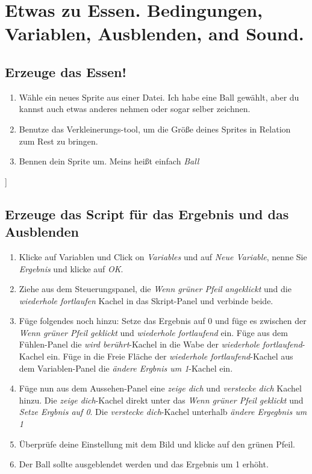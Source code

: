 \section{Etwas zu Essen. Bedingungen, Variablen, Ausblenden, and Sound.}

\subsection{Erzeuge das Essen!}
\begin{enumerate}

\item Wähle ein neues Sprite aus einer Datei. Ich habe eine Ball gewählt, aber du kannst auch etwas anderes nehmen oder sogar selber zeichnen.
\item Benutze das Verkleinerungs-tool, um die Größe deines Sprites in Relation zum Rest zu bringen.
\item Bennen dein Sprite um. Meins heißt einfach \textit{Ball}
\end{enumerate}]

\subsection{Erzeuge das Script für das Ergebnis und das Ausblenden}

\begin{enumerate}
\item Klicke auf Variablen und Click on \textit{Variables} und auf \textit{Neue Variable}, nenne Sie \textit{Ergebnis} und klicke auf \textit{OK}.
\item Ziehe aus dem Steuerungspanel, die \textit{Wenn grüner Pfeil angeklickt} und die \textit{wiederhole fortlaufen} Kachel in das Skript-Panel und verbinde beide.
\item Füge folgendes noch hinzu:
\subitem Setze das Ergebnis auf 0 und füge es zwischen der \textit{Wenn grüner Pfeil geklickt} und \textit{wiederhole fortlaufend} ein.
\subitem Füge aus dem Fühlen-Panel die \textit{wird berührt}-Kachel in die Wabe der \textit{wiederhole fortlaufend}-Kachel ein.
\subitem Füge in die Freie Fläche der \textit{wiederhole fortlaufend}-Kachel aus dem Variablen-Panel die \textit{ändere Ergbnis um 1}-Kachel ein.
\item Füge nun aus dem Aussehen-Panel eine \textit{zeige dich} und \textit{verstecke dich} Kachel hinzu.
\subitem Die \textit{zeige dich}-Kachel direkt unter das \textit{Wenn grüner Pfeil geklickt} und \textit{Setze Ergbnis auf 0}.
\subitem Die \textit{verstecke dich}-Kachel unterhalb \textit{ändere Ergegbnis um 1}
\item Überprüfe deine Einstellung mit dem Bild und klicke auf den grünen Pfeil.
\item Der Ball sollte ausgeblendet werden und das Ergebnis um 1 erhöht.
\end{enumerate}

